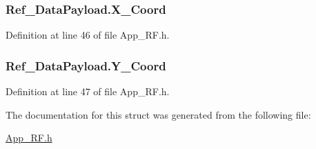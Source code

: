 \hypertarget{struct_ref___data_payload_a7fea4ab55431b1757755c5200fc1c3e0}{
\subsubsection[{X\_\-Coord}]{ {\bf Ref\_\-DataPayload.X\_\-Coord}}}
\label{struct_ref___data_payload_a7fea4ab55431b1757755c5200fc1c3e0}


Definition at line 46 of file App\_\-RF.h.

\hypertarget{struct_ref___data_payload_afa8ec9f1d908ed58d0d0409219cc4f53}{
\subsubsection[{Y\_\-Coord}]{ {\bf Ref\_\-DataPayload.Y\_\-Coord}}}
\label{struct_ref___data_payload_afa8ec9f1d908ed58d0d0409219cc4f53}


Definition at line 47 of file App\_\-RF.h.



The documentation for this struct was generated from the following file:\begin{DoxyCompactItemize}
\item 
\hyperlink{_app___r_f_8h}{App\_\-RF.h}\end{DoxyCompactItemize}
